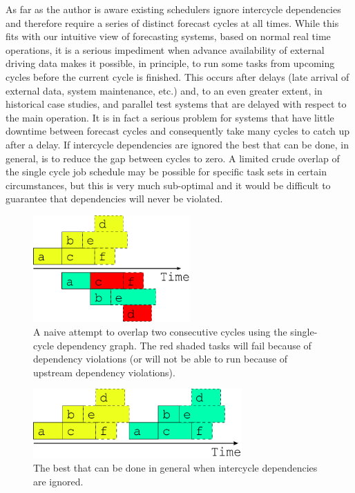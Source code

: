 \documentclass[11pt,a4paper]{article}
\begin{document}
As far as the author is aware existing schedulers ignore intercycle
dependencies and therefore require a series of distinct forecast cycles
at all times. While this fits with our intuitive view of forecasting
systems, based on normal real time operations, it is a serious
impediment when advance availability of external driving data makes it
possible, in principle, to run some tasks from upcoming cycles before
the current cycle is finished. This occurs after delays (late arrival of
external data, system maintenance, etc.) and, to an even greater extent,
in historical case studies, and parallel test systems that are delayed
with respect to the main operation. It is in fact a serious problem for
systems that have little downtime between forecast cycles and
consequently take many cycles to catch up after a delay. If intercycle
dependencies are ignored the best that can be done, in general, is to
reduce the gap between cycles to zero. A limited crude overlap of the
single cycle job schedule may be possible for specific task sets in
certain circumstances, but this is very much sub-optimal and it would be
difficult to guarantee that dependencies will never be violated.

\begin{figure}
    \begin{center}
        \includegraphics[width=6cm]{inkscape-svg/timeline-one-c} 
    \end{center}
    \caption{\small A naive attempt to overlap two consecutive cycles
    using the single-cycle dependency graph. The red shaded tasks will
    fail because of dependency violations (or will not be able to run
    because of upstream dependency violations).} 
    \label{fig-overlap}
\end{figure} 

\begin{figure}
    \begin{center}
        \includegraphics[width=8cm]{inkscape-svg/timeline-one-a} 
    \end{center}
    \caption{\small The best that can be done in general when intercycle dependencies 
    are ignored.} 
    \label{fig-foo}
\end{figure} 
\end{document}
